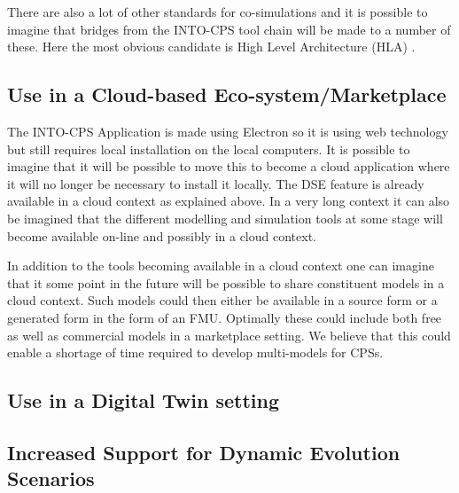 There are also a lot of other standards for co-simulations \cite{Gomes&18} and it is possible to imagine that bridges from the INTO-CPS tool chain will be made to a number of these. Here the most obvious candidate is High Level Architecture (HLA) \cite{IEEE1516}. 


\subsection{Use in a Cloud-based Eco-system/Marketplace}

The INTO-CPS Application is made using Electron so it is using web technology but still requires local installation on the local computers. It is possible to imagine that it will be possible to move this to become a cloud application where it will no longer be necessary to install it locally. The DSE feature is already available in a cloud context as explained above. In a very long context it can also be imagined that the different modelling and simulation tools at some stage will become available on-line and possibly in a cloud context.

In addition to the tools becoming available in a cloud context one can imagine that it some point in the future will be possible to share constituent models in a cloud context. Such models could then either be available in a source form or a generated form in the form of an FMU. Optimally these could include both free as well as commercial models in a marketplace setting. We believe that this could enable a shortage of time required to develop multi-models for CPSs.

\subsection{Use in a Digital Twin setting}


\subsection{Increased Support for Dynamic Evolution Scenarios}


